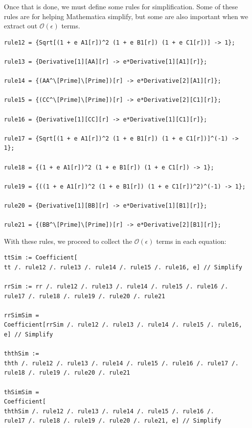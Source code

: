 \documentclass{book}
\theoremstyle{definition}
\begin{document}
Once that is done, we must define some rules for simplification. Some of these rules are for helping Mathematica simplify, but some are also important when we extract out $\mathcal{O}(\epsilon)$ terms. 
\begin{lstlisting}
rule12 = {Sqrt[(1 + e A1[r])^2 (1 + e B1[r]) (1 + e C1[r])] -> 1};

rule13 = {Derivative[1][AA][r] -> e*Derivative[1][A1][r]};

rule14 = {(AA^\[Prime]\[Prime])[r] -> e*Derivative[2][A1][r]};

rule15 = {(CC^\[Prime]\[Prime])[r] -> e*Derivative[2][C1][r]};

rule16 = {Derivative[1][CC][r] -> e*Derivative[1][C1][r]};

rule17 = {Sqrt[(1 + e A1[r])^2 (1 + e B1[r]) (1 + e C1[r])]^(-1) -> 1};

rule18 = {(1 + e A1[r])^2 (1 + e B1[r]) (1 + e C1[r]) -> 1};

rule19 = {((1 + e A1[r])^2 (1 + e B1[r]) (1 + e C1[r])^2)^(-1) -> 1};

rule20 = {Derivative[1][BB][r] -> e*Derivative[1][B1][r]};

rule21 = {(BB^\[Prime]\[Prime])[r] -> e*Derivative[2][B1][r]};
\end{lstlisting}
With these rules, we proceed to collect the $\mathcal{O}(\epsilon)$ terms in each equation:
\begin{lstlisting}
ttSim := Coefficient[
tt /. rule12 /. rule13 /. rule14 /. rule15 /. rule16, e] // Simplify

rrSim := rr /. rule12 /. rule13 /. rule14 /. rule15 /. rule16 /. 
rule17 /. rule18 /. rule19 /. rule20 /. rule21

rrSimSim = 
Coefficient[rrSim /. rule12 /. rule13 /. rule14 /. rule15 /. rule16, 
e] // Simplify

ththSim := 
thth /. rule12 /. rule13 /. rule14 /. rule15 /. rule16 /. rule17 /. 
rule18 /. rule19 /. rule20 /. rule21

thSimSim = 
Coefficient[
ththSim /. rule12 /. rule13 /. rule14 /. rule15 /. rule16 /. 
rule17 /. rule18 /. rule19 /. rule20 /. rule21, e] // Simplify
\end{lstlisting}
\end{document}
